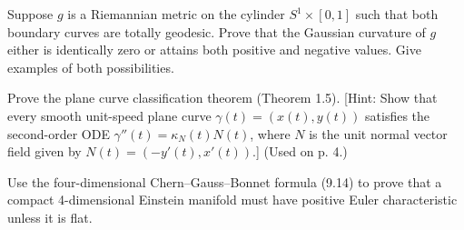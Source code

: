 \begin{exercise}
\label{prob:cylinder-metric-gaussian-curvature}
Suppose $g$ is a Riemannian metric on the cylinder $S^1 \times [0,1]$ such that both
boundary curves are totally geodesic. Prove that the Gaussian curvature of
$g$ either is identically zero or attains both positive and negative values. Give
examples of both possibilities.
\end{exercise}

\begin{exercise}
\label{prob:plane-curve-classification}
Prove the plane curve classification theorem (Theorem 1.5). [Hint: Show that
every smooth unit-speed plane curve $\gamma(t) = (x(t), y(t))$ satisfies the second-order ODE $\gamma''(t) = \kappa_N(t) N(t)$, where $N$ is the unit normal vector field given
by $N(t) = (-y'(t), x'(t))$.] (Used on p. 4.)
\end{exercise}

\begin{exercise}
\label{prob:einstein-manifold-euler-characteristic}
Use the four-dimensional Chern--Gauss--Bonnet formula (9.14) to prove that
a compact 4-dimensional Einstein manifold must have positive Euler characteristic unless it is flat.
\end{exercise}
